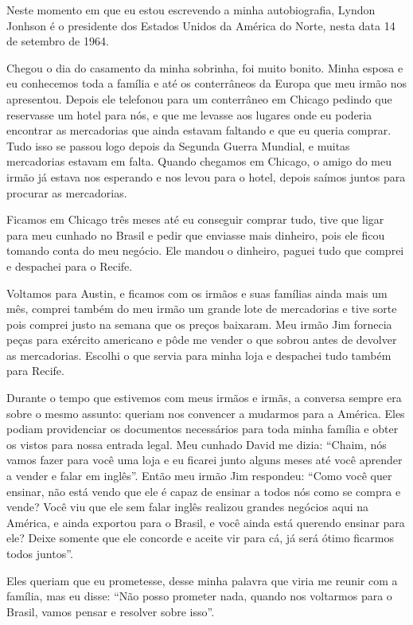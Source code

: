 Neste momento em que eu estou escrevendo a minha autobiografia, Lyndon
Jonhson é o presidente dos Estados Unidos da América do Norte, nesta
data 14 de setembro de 1964.

Chegou o dia do casamento da minha sobrinha, foi muito bonito. Minha
esposa e eu conhecemos toda a família e até os conterrâneos da Europa
que meu irmão nos apresentou. Depois ele telefonou para um conterrâneo
em Chicago pedindo que reservasse um hotel para nós, e que me levasse
aos lugares onde eu poderia encontrar as mercadorias que ainda estavam
faltando e que eu queria comprar. Tudo isso se passou logo depois da
Segunda Guerra Mundial, e muitas mercadorias estavam em falta. Quando
chegamos em Chicago, o amigo do meu irmão já estava nos esperando e nos
levou para o hotel, depois saímos juntos para procurar as mercadorias.

Ficamos em Chicago três meses até eu conseguir comprar tudo, tive que
ligar para meu cunhado no Brasil e pedir que enviasse mais dinheiro,
pois ele ficou tomando conta do meu negócio. Ele mandou o dinheiro,
paguei tudo que comprei e despachei para o Recife.

Voltamos para Austin, e ficamos com os irmãos e suas famílias ainda mais
um mês, comprei também do meu irmão um grande lote de mercadorias e tive
sorte pois comprei justo na semana que os preços baixaram. Meu irmão Jim
fornecia peças para exército americano e pôde me vender o que sobrou
antes de devolver as mercadorias. Escolhi o que servia para minha loja e
despachei tudo também para Recife.

Durante o tempo que estivemos com meus irmãos e irmãs, a conversa sempre
era sobre o mesmo assunto: queriam nos convencer a mudarmos para a
América. Eles podiam providenciar os documentos necessários para toda
minha família e obter os vistos para nossa entrada legal. Meu cunhado
David me dizia: ``Chaim, nós vamos fazer para você uma loja e eu ficarei
junto alguns meses até você aprender a vender e falar em inglês''. Então
meu irmão Jim respondeu: ``Como você quer ensinar, não está vendo que
ele é capaz de ensinar a todos nós como se compra e vende? Você viu que
ele sem falar inglês realizou grandes negócios aqui na América, e ainda
exportou para o Brasil, e você ainda está querendo ensinar para ele?
Deixe somente que ele concorde e aceite vir para cá, já será ótimo
ficarmos todos juntos''.

Eles queriam que eu prometesse, desse minha palavra que viria me reunir
com a família, mas eu disse: ``Não posso prometer nada, quando nos
voltarmos para o Brasil, vamos pensar e resolver sobre isso''.

